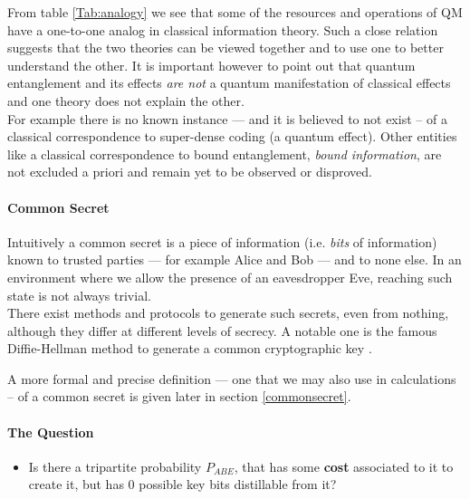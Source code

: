 From table \ref{Tab:analogy} we see that some of the resources and operations of QM have a one-to-one analog in classical information theory. 
Such a close relation suggests that the two theories can be viewed together and to use one to better understand the other. 
It is important however to point out that quantum entanglement and its effects \emph{are not} a quantum manifestation of classical effects and one theory does not explain the other. \\
For example there is no known instance --- and it is believed to not exist -- of a classical correspondence to super-dense coding (a quantum effect). Other entities like a classical correspondence to bound entanglement, \emph{bound information}, are not excluded a priori and remain yet to be observed or disproved.

\paragraph*{Common Secret}
Intuitively a common secret is a piece of information (i.e. \textit{bits} of information) known to trusted parties --- for example Alice and Bob --- and to none else. 
In an environment where we allow the presence of an eavesdropper Eve, reaching such state is not always trivial. \\
There exist methods and protocols to generate such secrets, even from nothing, although they differ at different levels of secrecy. A notable one is the famous Diffie-Hellman method to generate a common cryptographic key \cite{DH76} .

A more formal and precise definition --- one that we may also use in calculations -- of a common secret is given later in section \ref{commonsecret}.
\\

\paragraph*{The Question}
\begin{itemize}
		\item Is there a tripartite probability $P_{ABE}$, that has some \textbf{cost} associated to it to create it, but has $0$ possible key bits distillable from it? 
\end{itemize}


	